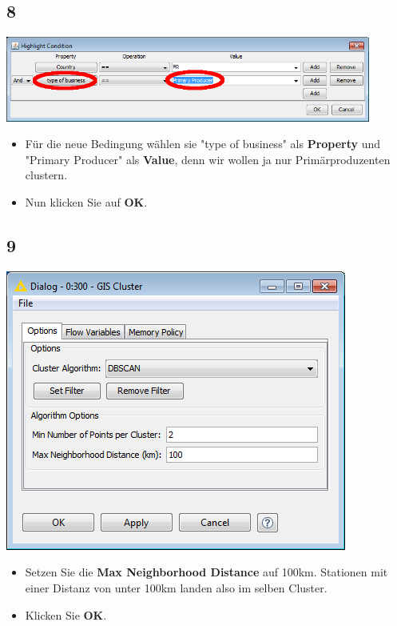 \documentclass{beamer}
\begin{document}
\subsection{8}
\begin{frame}
	\begin{center}
  		\includegraphics[width=0.9\textwidth]{8.png}
	\end{center}
	\begin{itemize}
		\item Für die neue Bedingung wählen sie "type of business" als \textbf{Property} und "Primary Producer" als \textbf{Value}, denn wir wollen ja nur Primärproduzenten clustern.
		\item Nun klicken Sie auf \textbf{OK}.
	\end{itemize}
\end{frame}

\subsection{9}
\begin{frame}
	\begin{center}
  		\includegraphics[height=0.6\textheight]{9.png}
	\end{center}
	\begin{itemize}
		\item Setzen Sie die \textbf{Max Neighborhood Distance} auf 100km. Stationen mit einer Distanz von unter 100km landen also im selben Cluster.
		\item Klicken Sie \textbf{OK}.
	\end{itemize}
\end{frame}
\end{document}
